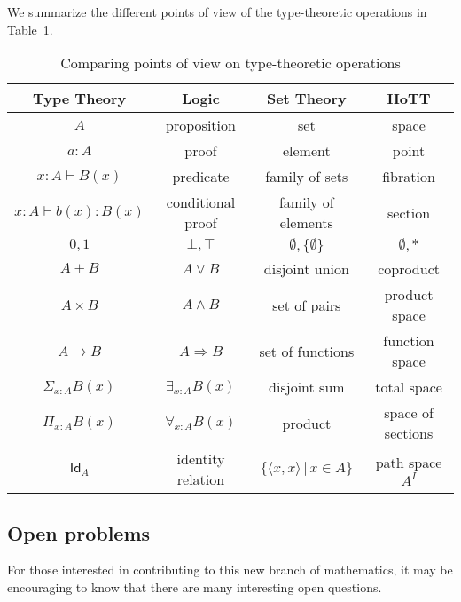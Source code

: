 {We summarize the different points of view of the type-theoretic operations in Table~\ref{tab:pov}.

\begin{table}\centering
  \begin{tabular}{c||c|c|c}
       Type Theory & Logic & Set Theory & HoTT\\\hline
       $A$ & proposition & set & space\\
       $a:A$ & proof & element & point \\
       $x:A \vdash B(x)$ & predicate & family of sets & fibration \\
       $x:A \vdash b(x) : B(x)$ & conditional proof & family of elements & section\\
       $0, 1$ & $\bot, \top$ & $\emptyset, \{ \emptyset \}$ & $\emptyset, *$\\
       $A + B$ & $A\vee B$ & disjoint union & coproduct\\
       $A\times B$ & $A\wedge B$ & set of pairs & product space\\
       $A\to B$ & $A\Rightarrow B$ & set of functions & function space\\
       $\Sigma_{x:A}B(x)$ &  $\exists_{x:A}B(x)$ & disjoint sum & total space\\
       $\Pi_{x:A}B(x)$ &  $\forall_{x:A}B(x)$ & product & space of sections\\
       $\mathsf{Id}_{A}$ & identity relation & $\{\langle x,x\rangle\, |\, x\in A\}$ & path space $A^I$
  \end{tabular}
  \caption{Comparing points of view on type-theoretic operations}\label{tab:pov}
\end{table}


\subsection*{Open problems} 

For those interested in contributing to this new branch of mathematics, it may be encouraging to know that there are many interesting open questions.

}
